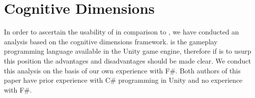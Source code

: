 \section{Cognitive Dimensions}
In order to ascertain the usability of \fs in comparison to \cs, we have conducted an analysis based on the cognitive dimensions framework\cite{green1996usability}. \cs is the gameplay programming language available in the Unity game engine, therefore if \fs is to usurp this position the advantages and disadvantages should be made clear. We conduct this analysis on the basis of our own experience with F\#. Both authors of this paper have prior experience with C\# programming in Unity and no experience with F\#.














